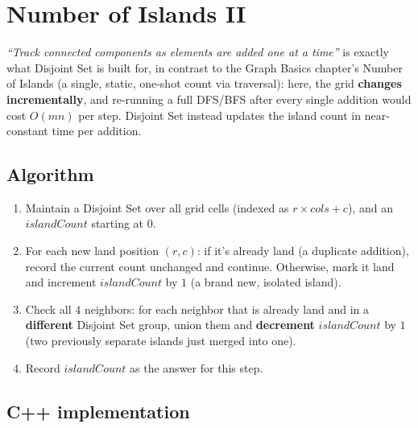 \section{Number of Islands II}
\label{sec:graph-number-of-islands-2}


\begin{patternbox}
\emph{``Track connected components as elements are added one at a
time''} is exactly what Disjoint Set is built for, in contrast to the
Graph Basics chapter's Number of Islands (a single, static, one-shot
count via traversal): here, the grid \textbf{changes incrementally},
and re-running a full DFS/BFS after every single addition would cost
$O(mn)$ per step. Disjoint Set instead updates the island count in
near-constant time per addition.
\end{patternbox}

\subsection*{Algorithm}

\begin{enumerate}
  \item Maintain a Disjoint Set over all grid cells (indexed as
        $r \times \textit{cols} + c$), and an $\textit{islandCount}$
        starting at $0$.
  \item For each new land position $(r,c)$: if it's already land
        (a duplicate addition), record the current count unchanged and
        continue. Otherwise, mark it land and increment
        $\textit{islandCount}$ by $1$ (a brand new, isolated island).
  \item Check all $4$ neighbors: for each neighbor that is already
        land and in a \textbf{different} Disjoint Set group, union
        them and \textbf{decrement} $\textit{islandCount}$ by $1$
        (two previously separate islands just merged into one).
  \item Record $\textit{islandCount}$ as the answer for this step.
\end{enumerate}

\subsection*{C++ implementation}

